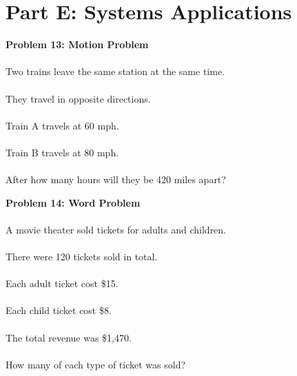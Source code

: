 \documentclass[12pt]{article}
\begin{document}
            \newpage

        \section*{Part E: Systems Applications}

            \textbf{Problem 13: Motion Problem}\\\\
            Two trains leave the same station at the same time.\\\\
            They travel in opposite directions.\\\\
            Train A travels at 60 mph.\\\\
            Train B travels at 80 mph.\\\\
            After how many hours will they be 420 miles apart?

            \vspace{5cm}

            \textbf{Problem 14: Word Problem}\\\\
            A movie theater sold tickets for adults and children.\\\\
            There were 120 tickets sold in total.\\\\
            Each adult ticket cost \$15.\\\\
            Each child ticket cost \$8.\\\\
            The total revenue was \$1,470.\\\\
            How many of each type of ticket was sold?
\end{document}

